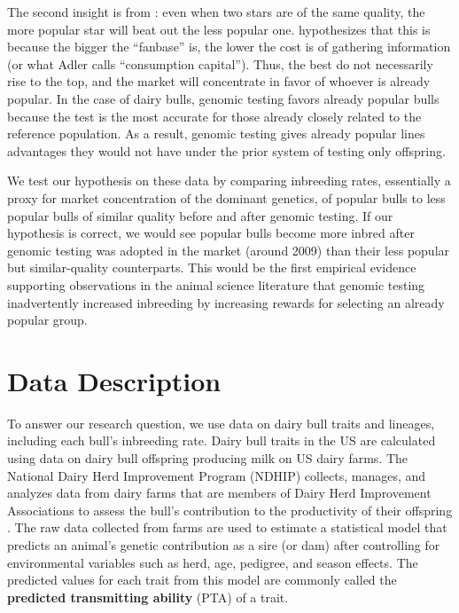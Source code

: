\documentclass[12pt,letterpaper]{article}
\begin{document}
The second insight is from \citet{adler1985stardom}: even when two stars are of the same quality, the more popular star will beat out the less popular one. \citet{adler1985stardom} hypothesizes that this is because the bigger the ``fanbase'' is, the lower the cost is of gathering information (or what Adler calls ``consumption capital''). Thus, the best do not necessarily rise to the top, and the market will concentrate in favor of whoever is already popular. In the case of dairy bulls, genomic testing favors already popular bulls because the test is the most accurate for those already closely related to the reference population. As a result, genomic testing gives already popular lines advantages they would not have under the prior system of testing only offspring.

We test our hypothesis on these data by comparing inbreeding rates, essentially a proxy for market concentration of the dominant genetics, of popular bulls to less popular bulls of similar quality before and after genomic testing. If our hypothesis is correct, we would see popular bulls become more inbred after genomic testing was adopted in the market (around 2009) than their less popular but similar-quality counterparts. This would be the first empirical evidence supporting observations in the animal science literature that genomic testing inadvertently increased inbreeding by increasing rewards for selecting an already popular group.

\section{Data Description\label{sec:data_description}}
To answer our research question, we use data on dairy bull traits and lineages, including each bull's inbreeding rate. Dairy bull traits in the US are calculated using data on dairy bull offspring producing milk on US dairy farms. The National Dairy Herd Improvement Program (NDHIP) collects, manages, and analyzes data from dairy farms that are members of Dairy Herd Improvement Associations to assess the bull's contribution to the productivity of their offspring \citep{Hutchins_Hueth2023}. The raw data collected from farms are used to estimate a statistical model that predicts an animal's genetic contribution as a sire (or dam) after controlling for environmental variables such as herd, age, pedigree, and season effects. The predicted values for each trait from this model are commonly called the \textbf{predicted transmitting ability} (PTA) of a trait.
\end{document}

